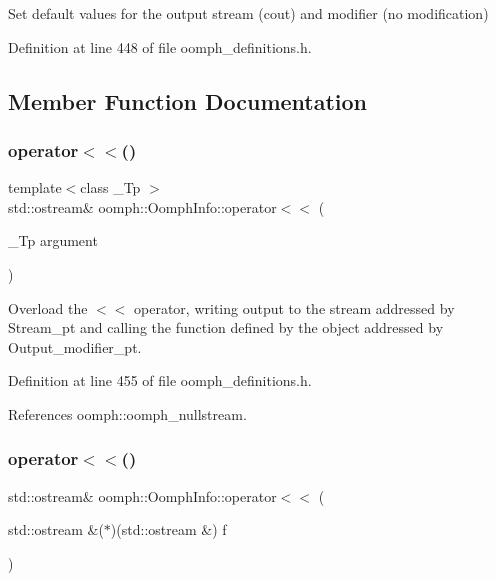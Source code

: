 Set default values for the output stream (cout) and modifier (no modification) 



Definition at line 448 of file oomph\+\_\+definitions.\+h.



\subsection{Member Function Documentation}
\mbox{\label{classoomph_1_1OomphInfo_aa2e50922c77991309f88aaf0440a78db}} 
\subsubsection{\texorpdfstring{operator$<$$<$()}{operator<<()}\hspace{0.1cm}{\footnotesize\ttfamily [1/2]}}
{\footnotesize\ttfamily template$<$class \+\_\+\+Tp $>$ \\
std\+::ostream\& oomph\+::\+Oomph\+Info\+::operator$<$$<$ (\begin{DoxyParamCaption}\item[{\+\_\+\+Tp}]{argument }\end{DoxyParamCaption})\hspace{0.3cm}{\ttfamily [inline]}}



Overload the $<$$<$ operator, writing output to the stream addressed by Stream\+\_\+pt and calling the function defined by the object addressed by Output\+\_\+modifier\+\_\+pt. 



Definition at line 455 of file oomph\+\_\+definitions.\+h.



References oomph\+::oomph\+\_\+nullstream.

\mbox{\label{classoomph_1_1OomphInfo_a01f770fe14e9f8882dea064e5f4dd1c6}} 
\subsubsection{\texorpdfstring{operator$<$$<$()}{operator<<()}\hspace{0.1cm}{\footnotesize\ttfamily [2/2]}}
{\footnotesize\ttfamily std\+::ostream\& oomph\+::\+Oomph\+Info\+::operator$<$$<$ (\begin{DoxyParamCaption}\item[{std\+::ostream \&($\ast$)(std\+::ostream \&)}]{f }\end{DoxyParamCaption})\hspace{0.3cm}{\ttfamily [inline]}}



